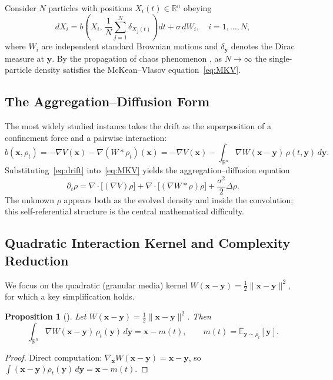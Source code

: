\documentclass[12pt]{article}
\newcommand{\bx}{\mathbf{x}}
\newcommand{\by}{\mathbf{y}}
\newcommand{\E}{\mathbb{E}}
\newcommand{\Rn}{\mathbb{R}^n}
\theoremstyle{plain}
\newtheorem{proposition}{Proposition}
\begin{document}
Consider $N$ particles with positions $X_i(t)\in\Rn$ obeying
\begin{equation}
  dX_i = b\!\left(X_i,\,\frac{1}{N}\sum_{j=1}^N \delta_{X_j(t)}\right)dt + \sigma\,dW_i,
  \quad i=1,\ldots,N,
  \label{eq:particles}
\end{equation}
where $W_i$ are independent standard Brownian motions and $\delta_{\by}$ denotes the
Dirac measure at $\by$. By the propagation of chaos phenomenon \cite{Sznitman1991},
as $N\to\infty$ the single-particle density satisfies the McKean--Vlasov equation~\eqref{eq:MKV}.

\subsection{The Aggregation--Diffusion Form}

The most widely studied instance takes the drift as the superposition of a confinement
force and a pairwise interaction:
\begin{equation}
  b(\bx,\rho_t) = -\nabla V(\bx) - \nabla(W*\rho_t)(\bx)
  = -\nabla V(\bx) - \int_{\Rn}\nabla W(\bx-\by)\,\rho(t,\by)\,d\by.
  \label{eq:drift}
\end{equation}
Substituting~\eqref{eq:drift} into~\eqref{eq:MKV} yields the aggregation--diffusion
equation
\begin{equation}
  \partial_t \rho
  = \nabla\cdot\bigl[(\nabla V)\rho\bigr]
  + \nabla\cdot\bigl[(\nabla W*\rho)\rho\bigr]
  + \frac{\sigma^2}{2}\Delta\rho.
  \label{eq:aggdiff}
\end{equation}
The unknown $\rho$ appears both as the evolved density and inside the convolution; this
self-referential structure is the central mathematical difficulty.

\subsection{Quadratic Interaction Kernel and Complexity Reduction}
\label{sec:quadratic}

We focus on the quadratic (granular media) kernel
$W(\bx-\by)=\frac{1}{2}\|\bx-\by\|^2$, for which a key simplification holds.

\begin{proposition}[\cite{McCann1997}]
\label{prop:quadratic}
Let $W(\bx-\by)=\frac{1}{2}\|\bx-\by\|^2$. Then
\begin{equation}
  \int_{\Rn}\nabla W(\bx-\by)\,\rho_t(\by)\,d\by
  = \bx - m(t),
  \qquad m(t)=\E_{\by\sim\rho_t}[\by].
  \label{eq:quadreduction}
\end{equation}
\end{proposition}
\begin{proof}
Direct computation: $\nabla_{\bx}W(\bx-\by)=\bx-\by$, so
$\int(\bx-\by)\rho_t(\by)\,d\by=\bx-m(t)$.
\end{proof}
\end{document}
